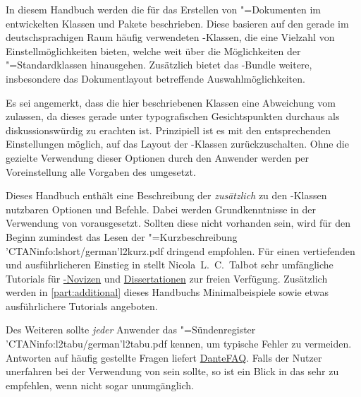 \addchap[tocentry={}]{\prefacename}
In diesem Handbuch werden die für das Erstellen von "=Dokumenten 
im \href{https://tu-dresden.de/cd}{\TUDCD} entwickelten Klassen und Pakete 
beschrieben. Diese basieren auf den gerade im deutschsprachigen Raum häufig 
verwendeten \KOMAScript-Klassen, die eine Vielzahl von Einstellmöglichkeiten 
bieten, welche weit über die Möglichkeiten der "=Standardklassen 
hinausgehen. Zusätzlich bietet das \TUDScript-Bundle weitere, insbesondere das 
Dokumentlayout betreffende Auswahlmöglichkeiten.

Es sei angemerkt, dass die hier beschriebenen Klassen eine Abweichung vom 
\TUDCD zulassen, da dieses gerade unter typografischen Gesichtspunkten 
durchaus als diskussionswürdig zu erachten ist. Prinzipiell ist es mit den 
entsprechenden Einstellungen möglich, auf das Layout der \KOMAScript-Klassen 
zurückzuschalten. Ohne die gezielte Verwendung dieser Optionen durch den 
Anwender werden per Voreinstellung alle Vorgaben des \CDs umgesetzt.

Dieses Handbuch enthält eine Beschreibung der \emph{zusätzlich} zu den 
\KOMAScript-Klassen nutzbaren Optionen und Befehle. Dabei werden 
Grundkenntnisse in der Verwendung von  vorausgesetzt. Sollten 
diese nicht vorhanden sein, wird für den Beginn zumindest das Lesen der 
"=Kurzbeschreibung \File'CTANinfo:lshort/german'{l2kurz.pdf} 
dringend empfohlen. Für einen vertiefenden und ausführlicheren Einstieg in 
 stellt Nicola~L.~C.~Talbot sehr umfängliche Tutorials für 
\href{http://www.dickimaw-books.com/latex/novices/}{-Novizen} 
und \href{http://www.dickimaw-books.com/latex/thesis/}{Dissertationen} zur 
freien Verfügung. Zusätzlich werden in \autoref{part:additional} dieses 
Handbuchs Minimalbeispiele sowie etwas ausführlichere Tutorials angeboten.

Des Weiteren sollte \emph{jeder} Anwender das "=Sündenregister 
\File'CTANinfo:l2tabu/german'{l2tabu.pdf} kennen, um typische Fehler zu 
vermeiden. Antworten auf häufig gestellte Fragen liefert 
\href{http://projekte.dante.de/DanteFAQ/WebHome}{DanteFAQ}. Falls der Nutzer 
unerfahren bei der Verwendung von \KOMAScript sein sollte, so ist ein Blick in 
das  sehr zu empfehlen, wenn nicht sogar 
unumgänglich.

